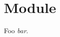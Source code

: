 \section{Module }\label{External}%
\label{External--val-foo}\begin{ocamlindent}Foo \emph{bar}.\end{ocamlindent}%
\medbreak


